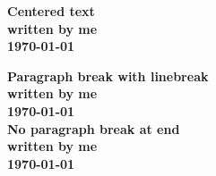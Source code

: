 \documentclass{article}
\begin{document}
 {\centering
     \huge\bfseries Centered text \\
     \Large\normalfont written by me \\
     \normalsize\today
		 
 }
 {\centering
     \huge\bfseries Paragraph break with linebreak \\
     \Large\normalfont written by me \\
     \normalsize\today\\
 }
 {\centering
     \huge\bfseries No paragraph break at end \\
     \Large\normalfont written by me \\
     \normalsize\today
 }
 
\end{document}
